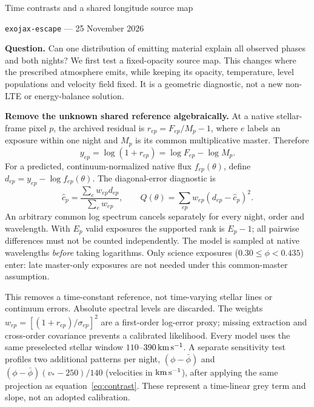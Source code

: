 \documentclass[10pt,a4paper]{article}
\begin{document}
\begin{center}
{\Large Time contrasts and a shared longitude source map}\par\vspace{4pt}
\texttt{exojax-escape} --- 25 November 2026
\end{center}

\textbf{Question.} Can one distribution of emitting material explain all
observed phases and both nights? We first test a fixed-opacity source map.
This changes where the prescribed atmosphere emits, while keeping its
opacity, temperature, level populations and velocity field fixed. It is a
geometric diagnostic, not a new non-LTE or energy-balance solution.

\textbf{Remove the unknown shared reference algebraically.}
At a native stellar-frame pixel $p$, the archived residual is
$r_{ep}=F_{ep}/M_p-1$, where $e$ labels an exposure within one night and
$M_p$ is its common multiplicative master. Therefore
\begin{equation}
y_{ep}=\log(1+r_{ep})=\log F_{ep}-\log M_p.
\end{equation}
For a predicted, continuum-normalized native flux $f_{ep}(\theta)$, define
$d_{ep}=y_{ep}-\log f_{ep}(\theta)$. The diagonal-error diagnostic is
\begin{equation}
\widehat c_p=\frac{\sum_e w_{ep}d_{ep}}{\sum_e w_{ep}},\qquad
Q(\theta)=\sum_{ep}w_{ep}(d_{ep}-\widehat c_p)^2.
\label{eq:contrast}
\end{equation}
An arbitrary common log spectrum cancels separately for every night, order
and wavelength. With $E_p$ valid exposures the supported rank is $E_p-1$;
all pairwise differences must not be counted independently. The model is
sampled at native wavelengths \emph{before} taking logarithms. Only science
exposures ($0.30\leq\phi<0.435$) enter: late master-only exposures are not needed
under this common-master assumption.

This removes a time-constant reference, not time-varying stellar lines or
continuum errors. Absolute spectral levels are discarded. The weights
$w_{ep}=[(1+r_{ep})/\sigma_{ep}]^2$ are a first-order log-error proxy; missing
extraction and cross-order covariance prevents a calibrated likelihood.
Every model uses the same preselected stellar window $110$--$390\,{\rm km\,s^{-1}}$.
A separate sensitivity test profiles two additional patterns per night,
$(\phi-\bar\phi)$ and $(\phi-\bar\phi)(v_*-250)/140$ (velocities in
${\rm km\,s^{-1}}$), after applying the same projection as equation~\eqref{eq:contrast}.
These represent a time-linear grey term and slope, not an adopted calibration.
\end{document}
